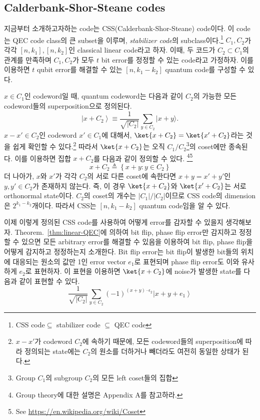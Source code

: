 \subsection{Calderbank-Shor-Steane codes}
지금부터 소개하고자하는 code는 CSS(Calderbank-Shor-Steane) code이다. 이 code는 QEC code class의 큰 subset을 이루며, \textit{stabilizer code}의 subclass이다.\footnote{CSS code$\subseteq$ stabilizer code $\subseteq$ QEC code}
$C_1, C_2$가 각각 $[n, k_1], [n, k_2]$인 classical linear code라고 하자. 이때, 두 코드가 $C_2 \subset C_1$의 관계를 만족하며 $C_1, C_2$가 모두 $t$ bit error를 정정할 수 있는 code라고 가정하자.
이를 이용하면 $t$ qubit error를 해결할 수 있는 $[n, k_1 - k_2]$ quantum code를 구성할 수 있다.

$x \in C_1$인 codeword일 때, quantum codeword는 다음과 같이 $C_2$의 가능한 모든 codeword들의 superposition으로 정의된다.
\begin{equation*}
    \left|x+C_2\right\rangle \equiv \frac{1}{\sqrt{\left|C_2\right|}} \sum_{y \in C_2}|x+y\rangle .
\end{equation*}
$x - x' \in C_2$인 codeword $x' \in C_1$에 대해서, $\ket{x+C_2} = \ket{x'+C_2}$라는 것을 쉽게 확인할 수 있다.\footnote{$x - x'$가 codeword $C_2$에 속하기 때문에, 모든 codeword들의 superposition에 따라 정의되는 state에는 $C_2$의 원소를 더하거나 빼더라도 여전히 동일한 상태가 된다.}
따라서 $\ket{x+C_2}$는 오직 $C_1/C_2$\footnote{Group $C_1$의 subgroup $C_2$의 모든 left coset들의 집합}의 coset에만 종속된다. 이를 이용하면 집합 $x+C_2$를 다음과 같이 정의할 수 있다. \footnote{Group theory에 대한 설명은 Appendix A를 참고하라.}\footnote{See \url{https://en.wikipedia.org/wiki/Coset}}
\begin{equation*}
    x+C_2 \triangleq \left\{x+y: y \in C_2\right\}
\end{equation*}
더 나아가, $x$와 $x'$가 각각 $C_2$의 서로 다른 coset에 속한다면 $x+y = x'+y'$인 $y, y' \in C_2$가 존재하지 않는다. 즉, 이 경우 $\ket{x+C_2}$와 $\ket{x'+C_2}$는 서로 orthonormal state이다. $C_2$의 coset의 개수는 $|C_1|/|C_2|$이므로 CSS code의 dimension은 $2^{k_1 - k_2}$개이다. 따라서 CSS는 $[n, k_1 - k_2]$ quantum code임을 알 수 있다.

\vspace{1em}
이제 이렇게 정의된 CSS code를 사용하여 어떻게 error를 감자할 수 있을지 생각해보자. Theorem.~\ref{thm:linear-QEC}에 의하여 bit flip, phase flip error만 감지하고 정정할 수 있으면 모든 arbitrary error를 해결할 수 있음을 이용하여 bit flip, phase flip을 어떻게 감지하고 정정하는지 소개한다.
Bit flip error는 bit flip이 발생한 bit들의 위치에 대응되는 원소의 값만 1인 error vector $e_1$로 표현되며 phase flip error도 이와 유사하게 $e_2$로 표현하자. 이 표현을 이용하면 $\ket{x+C_2}$에 noise가 발생한 state를 다음과 같이 표현할 수 있다. 
\begin{equation*}
    \frac{1}{\sqrt{\left|C_2\right|}} \sum_{y \in C_2}(-1)^{(x+y) \cdot \epsilon_2}\left|x+y+e_1\right\rangle
\end{equation*}

